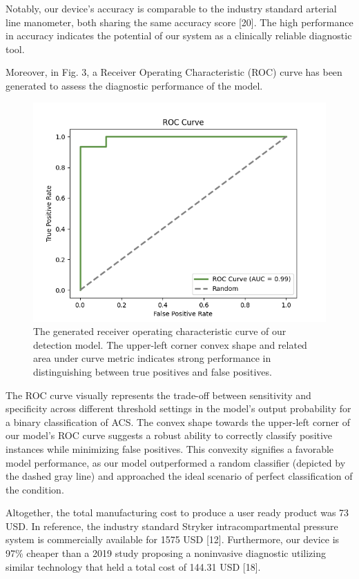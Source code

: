 \documentclass{article}
\begin{document}
Notably, our device's accuracy is comparable to the industry standard arterial line manometer, both sharing the same accuracy score [20]. The high performance in accuracy indicates the potential of our system as a clinically reliable diagnostic tool.

Moreover, in Fig. 3, a Receiver Operating Characteristic (ROC) curve has been generated to assess the diagnostic performance of the model.

\begin{figure}[H] %
    \centering
    \includegraphics[width=0.7\linewidth]{ROC_curve.png}
    \caption{The generated receiver operating characteristic curve of our detection model. The upper-left corner convex shape and related area under curve metric indicates strong performance in distinguishing between true positives and false positives.}
    \label{fig:fig4}
\end{figure}

 The ROC curve visually represents the trade-off between sensitivity and specificity across different threshold settings in the model’s output probability for a binary classification of ACS. The convex shape towards the upper-left corner of our model’s ROC curve suggests a robust ability to correctly classify positive instances while minimizing false positives. This convexity signifies a favorable model performance, as our model outperformed a random classifier (depicted by the dashed gray line) and approached the ideal scenario of perfect classification of the condition. 

Altogether, the total manufacturing cost to produce a user ready product was 73 USD. In reference, the industry standard Stryker intracompartmental pressure system is commercially available for 1575 USD [12]. Furthermore, our device is 97\% cheaper than a 2019 study proposing a noninvasive diagnostic utilizing similar technology that held a total cost of  144.31 USD [18]. 
\end{document}
